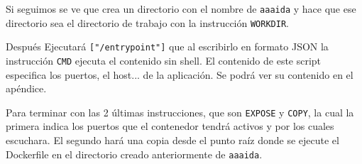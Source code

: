 Si seguimos se ve que crea un directorio con el nombre de \texttt{aaaida} y hace que ese directorio sea el directorio de trabajo con la instrucción \texttt{WORKDIR}.
 
Después Ejecutará \texttt{["/entrypoint"]} que al escribirlo en formato JSON la instrucción \texttt{CMD} ejecuta el contenido sin shell. El contenido de este script especifica los puertos, el host... de la aplicación. Se podrá ver su contenido en el apéndice.
 
Para terminar con las 2 últimas instrucciones, que son \texttt{EXPOSE} y \texttt{COPY}, la cual la primera indica los puertos que el contenedor tendrá activos y por los cuales escuchara. El segundo hará una copia desde el punto raíz donde se ejecute el Dockerfile en el directorio creado anteriormente de \texttt{aaaida}. 